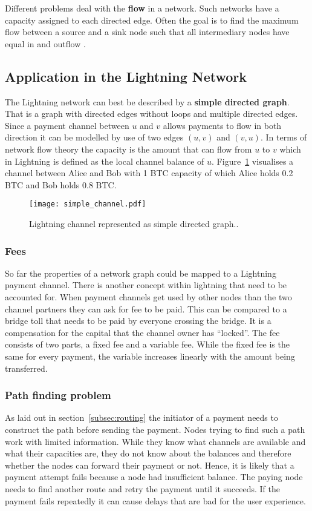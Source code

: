 \documentclass[final]{fhnwreport}       %
\begin{document}
Different problems deal with the \textbf{flow} in a network. Such networks have a capacity assigned to each directed edge. Often the goal is to find the maximum flow between a source and a sink node such that all intermediary nodes have equal in and outflow \citep{even_network_1975}.

\subsection{Application in the Lightning Network}
The Lightning network can best be described by a \textbf{simple directed graph}. That is a graph with directed edges without loops and multiple directed edges. Since a payment channel between $u$ and $v$ allows payments to flow in both direction it can be modelled by use of two edges $(u, v)$ and $(v, u)$. In terms of network flow theory the capacity is the amount that can flow from $u$ to $v$ which in Lightning is defined as the local channel balance of $u$. Figure~\ref{fig:channel_graph} visualises a channel between Alice and Bob with 1 BTC capacity of which Alice holds 0.2 BTC and Bob holds 0.8 BTC.

\begin{figure}[H]
\centering
\texttt{[image: simple\_channel.pdf]}
\caption{Lightning channel represented as simple directed graph..}
\label{fig:channel_graph}
\end{figure}

\subsubsection{Fees}
So far the properties of a network graph could be mapped to a Lightning payment channel. There is another concept within lightning that need to be accounted for. When payment channels get used by other nodes than the two channel partners they can ask for fee to be paid. This can be compared to a bridge toll that needs to be paid by everyone crossing the bridge. It is a compensation for the capital that the channel owner has ``locked''. The fee consists of two parts, a fixed fee and a variable fee. While the fixed fee is the same for every payment, the variable increases linearly with the amount being transferred.

\subsubsection{Path finding problem}
As laid out in section~\ref{subsec:routing} the initiator of a payment needs to construct the path before sending the payment. Nodes trying to find such a path work with limited information. While they know what channels are available and what their capacities are, they do not know about the balances and therefore whether the nodes can forward their payment or not. Hence, it is likely that a payment attempt fails because a node had insufficient balance. The paying node needs to find another route and retry the payment until it succeeds. If the payment fails repeatedly it can cause delays that are bad for the user experience.
\end{document}
